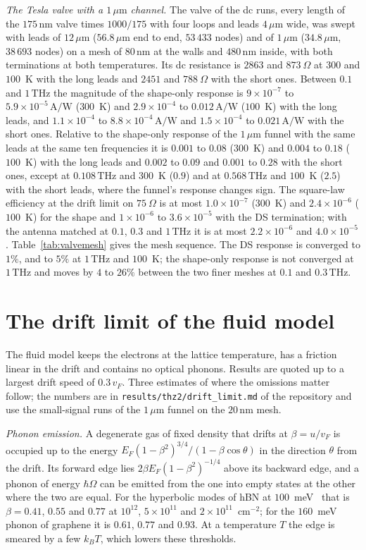 \documentclass[aps,prapplied,onecolumn,superscriptaddress,floatfix]{revtex4-2}
\newcommand{\um}{\,\mu\mathrm{m}}
\newcommand{\nm}{\,\mathrm{nm}}
\newcommand{\THz}{\,\mathrm{THz}}
\newcommand{\AW}{\,\mathrm{A/W}}
\begin{document}
\emph{The Tesla valve with a $1\um$ channel.} The valve of the dc runs,
every length of the $175\nm$ valve times $1000/175$ with four loops and
leads $4\um$ wide, was swept with leads of $12\um$ ($56.8\um$ end to
end, $53\,433$ nodes) and of $1\um$ ($34.8\um$, $38\,693$ nodes) on a
mesh of $80\nm$ at the walls and $480\nm$ inside, with both terminations
at both temperatures. Its dc resistance is $2863$ and $873\ \Omega$ at
$300$ and $100$~K with the long leads and $2451$ and $788\ \Omega$ with
the short ones. Between $0.1$ and $1\THz$ the magnitude of the
shape-only response is $9\times10^{-7}$ to $5.9\times10^{-5}\AW$
($300$~K) and $2.9\times10^{-4}$ to $0.012\AW$ ($100$~K) with the long
leads, and $1.1\times10^{-4}$ to $8.8\times10^{-4}\AW$ and
$1.5\times10^{-4}$ to $0.021\AW$ with the short ones. Relative to the
shape-only response of the $1\um$ funnel with the same leads at the same
ten frequencies it is $0.001$ to $0.08$ ($300$~K) and $0.004$ to $0.18$
($100$~K) with the long leads and $0.002$ to $0.09$ and $0.001$ to
$0.28$ with the short ones, except at $0.108\THz$ and $300$~K ($0.9$)
and at $0.568\THz$ and $100$~K ($2.5$) with the short leads, where the
funnel's response changes sign. The square-law efficiency at the drift
limit on $75\ \Omega$ is at most $1.0\times10^{-7}$ ($300$~K) and
$2.4\times10^{-6}$ ($100$~K) for the shape and $1\times10^{-6}$ to
$3.6\times10^{-5}$ with the DS termination; with the antenna matched at
$0.1$, $0.3$ and $1\THz$ it is at most $2.2\times10^{-6}$ and
$4.0\times10^{-5}$. Table~\ref{tab:valvemesh} gives the mesh sequence.
The DS response is converged to $1\%$, and to $5\%$ at $1\THz$ and
$100$~K; the shape-only response is not converged at $1\THz$ and moves
by $4$ to $26\%$ between the two finer meshes at $0.1$ and $0.3\THz$.

\section{The drift limit of the fluid model}

The fluid model keeps the electrons at the lattice temperature, has a
friction linear in the drift and contains no optical phonons. Results are
quoted up to a largest drift speed of $0.3\,v_{F}$. Three estimates of
where the omissions matter follow; the numbers are in
\texttt{results/thz2/drift\_limit.md} of the repository and use the
small-signal runs of the $1\um$ funnel on the $20\nm$ mesh.

\emph{Phonon emission.} A degenerate gas of fixed density that drifts at
$\beta=u/v_{F}$ is occupied up to the energy
$E_{F}(1-\beta^{2})^{3/4}/(1-\beta\cos\theta)$ in the direction $\theta$
from the drift. Its forward edge lies
$2\beta E_{F}(1-\beta^{2})^{-1/4}$ above its backward edge, and a phonon
of energy $\hbar\Omega$ can be emitted from the one into empty states at
the other where the two are equal. For the hyperbolic modes of hBN at
$100$~meV~\cite{tielrooij2018out} that is $\beta=0.41$, $0.55$ and $0.77$
at $10^{12}$, $5\times10^{11}$ and $2\times10^{11}$~cm$^{-2}$; for the
$160$~meV phonon of graphene it is $0.61$, $0.77$ and $0.93$. At a
temperature $T$ the edge is smeared by a few $k_{B}T$, which lowers these
thresholds.
\end{document}
